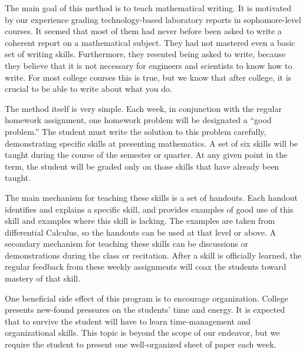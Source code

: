 %
%
%
%
%
%
%
%


The main goal of this method is to teach mathematical writing.  It is
motivated by our experience grading technology-based laboratory
reports in sophomore-level courses.  It seemed that most of them had
never before been asked to write a coherent report on a mathematical
subject. They had not mastered even a basic set of writing
skills. Furthermore, they resented being asked to write, because they
believe that it is not necessary for engineers and scientists to know
how to write. For most college courses this is true, but we know that
after college, it is crucial to be able to write about what you do.

The method itself is very simple.
Each week, in conjunction with the regular homework assignment, one
homework problem will be designated a ``good problem.'' The student must
write the solution to this problem carefully, demonstrating specific skills
at presenting mathematics. A set of six skills will be
taught during the course of the semester or quarter. 
At any given point in the term,
the student will be graded only on
those skills that have already been taught. 

The main mechanism for teaching these skills is a set of
handouts. Each handout identifies and explains a specific skill, and
provides examples of good use of this skill and examples where this
skill is lacking.  The examples are taken from differential Calculus,
so the handouts can be used at that level or above.  A secondary
mechanism for teaching these skills can be discussions or
demonstrations during the class or recitation.  After a skill is officially
learned, the regular feedback from these weekly assignments will coax
the students toward mastery of that skill.

One beneficial side effect of this program is to encourage
organization. College presents new-found pressures on the students' time and
energy. It is expected that to survive the student will have to learn
time-management and organizational skills. This topic is beyond the scope
of our endeavor, but we require the student to present one well-organized
sheet of paper each week.
	
